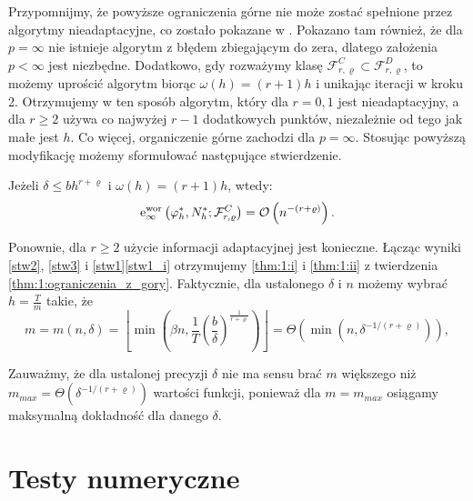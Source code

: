 \documentclass[oik, pdftex, robocza, man]{mgrwms}
\begin{document}
    Przypomnijmy, że powyższe ograniczenia górne nie może zostać spełnione przez algorytmy nieadaptacyjne, co zostało pokazane w \cite{PoA}. Pokazano tam również, że dla $p=\infty$ nie istnieje algorytm z błędem zbiegającym do zera, dlatego założenia $p < \infty$ jest niezbędne. Dodatkowo, gdy rozważymy klasę $\mathcal{F}_{r, \varrho}^{C} \subset \mathcal{F}_{r, \varrho}^{D}$, to możemy uprościć algorytm biorąc $\omega(h) = (r+1)h$ i unikając iteracji w kroku 2. Otrzymujemy w ten sposób algorytm, który dla $r=0,1$ jest nieadaptacyjny, a dla $r \geq 2$ używa co najwyżej $r-1$ dodatkowych punktów, niezależnie od tego jak małe jest $h$. Co więcej, organiczenie górne zachodzi dla $p = \infty$.
    Stosując powyższą modyfikację możemy sformułować następujące stwierdzenie.

    \begin{stw}
        \label{stw3}
        Jeżeli $\delta \leq bh^{r+\varrho}$ i $\omega(h) = (r+1)h$, wtedy:
        \begin{equation}
            \mathrm{e}_{\infty}^{\mathrm{\mathrm{wor}}}\left(\varphi_{h}^{*}, N_{h}^{*} ; \mathcal{F}_{r, \varrho}^{C}\right)=\mathcal{O}\left(n^{-(r+\varrho)}\right) .
        \end{equation}
    \end{stw}

    Ponownie, dla $r \geq 2$ użycie informacji adaptacyjnej jest konieczne. Łącząc wyniki \eqref{stw2}, \eqref{stw3} i \eqref{stw1}\eqref{stw1_i} otrzymujemy \ref{thm:1:i} i \ref{thm:1:ii} z twierdzenia \eqref{thm:1:ograniczenia_z_gory}.
    Faktycznie, dla ustalonego $\delta$ i $n$ możemy wybrać $h = \frac{T}{m}$ takie, że
    \begin{equation}
        m = m(n, \delta)=\left\lfloor\min \left(\beta n, \frac{1}{T}\left(\frac{b}{\delta}\right)^{\frac{1}{r+\varrho}}\right)\right\rfloor=\varTheta\left(\min \left(n, \delta^{-1 /(r+\varrho)}\right)\right),
    \end{equation}

    \begin{uw}
        Zauważmy, że dla ustalonej precyzji $\delta$ nie ma sensu brać $m$ większego niż $m_{max} = \varTheta(\delta^{-1 / (r+\varrho)})$ wartości funkcji, ponieważ dla $m = m_{max}$ osiągamy maksymalną dokładność dla danego $\delta$.
    \end{uw}

\mgrclosechapter


\chapter{Testy numeryczne}
\end{document}
